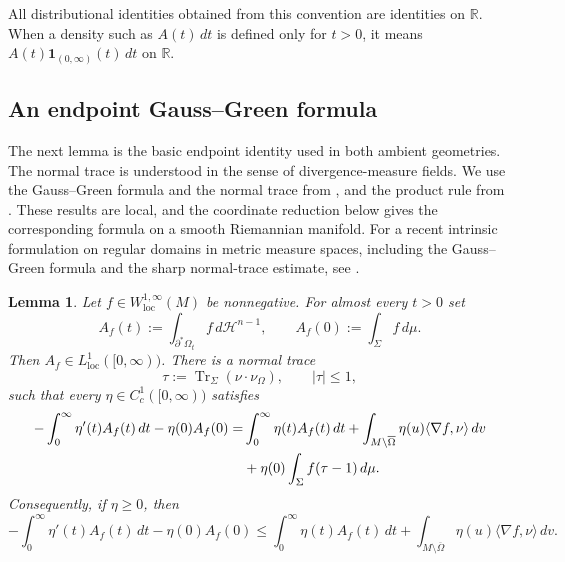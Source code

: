 \documentclass[10pt,a4paper]{amsart}
\numberwithin{equation}{section}
\newtheorem{lemma}[theorem]{Lemma}
\newcommand{\calH}{\mathcal H}
\begin{document}
All distributional identities obtained from this convention are identities on $\mathbb R$.  When a density such as $A(t)\,dt$ is defined only for $t>0$, it means $A(t)\mathbf 1_{(0,\infty)}(t)\,dt$ on $\mathbb R$.

\subsection{An endpoint Gauss--Green formula}\label{subsec:endpoint-GG}

The next lemma is the basic endpoint identity used in both ambient geometries.  The normal trace is understood in the sense of divergence-measure fields.  We use the Gauss--Green formula and the normal trace from \cite[Theorem~2.2]{ChenFrid1999}, and the product rule from \cite[Theorem~3.1]{ChenFrid1999}.  These results are local, and the coordinate reduction below gives the corresponding formula on a smooth
Riemannian manifold.  For a recent intrinsic formulation on regular
domains in metric measure spaces, including the Gauss--Green formula
and the sharp normal-trace estimate, see \cite[Theorem~3.6]{GornyMazon2024}.

\begin{lemma}\label{lem:endpoint-transport}
Let $f\in W^{1,\infty}_{\mathrm{loc}}(M)$ be nonnegative.  For almost every $t>0$ set
\begin{equation*}
    A_f(t):=\int_{\partial^*\Omega_t}f\,d\calH^{n-1},
    \qquad
    A_f(0):=\int_\Sigma f\,d\mu.
\end{equation*}
Then $A_f\in L^1_{\mathrm{loc}}([0,\infty))$.  There is a normal trace
\begin{equation*}
    \tau:=\operatorname{Tr}_\Sigma(\nu\cdot\nu_\Omega),
    \qquad |\tau|\leq1,
\end{equation*}
such that every $\eta\in C_c^1([0,\infty))$ satisfies
\begin{align}
    -\int_0^\infty\eta'(t)A_f(t)\,dt-\eta(0)A_f(0)
    =&\int_0^\infty\eta(t)A_f(t)\,dt 
      +\int_{M\setminus\overline\Omega}\eta(u)\langle\nabla f,\nu\rangle\,dv \notag\\
    &+\eta(0)\int_\Sigma f(\tau-1)\,d\mu.\label{eq:endpoint-transport-exact}
\end{align}
Consequently, if $\eta\geq0$, then
\begin{equation}\label{eq:endpoint-transport-ineq}
    -\int_0^\infty\eta'(t)A_f(t)\,dt-\eta(0)A_f(0)
    \leq
    \int_0^\infty\eta(t)A_f(t)\,dt
    +\int_{M\setminus\overline\Omega}\eta(u)\langle\nabla f,\nu\rangle\,dv.
\end{equation}
\end{lemma}
\end{document}

